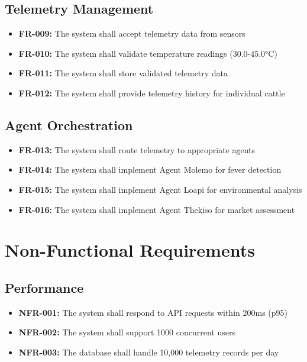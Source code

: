\subsection{Telemetry Management}

\begin{itemize}
    \item \textbf{FR-009:} The system shall accept telemetry data from sensors
    \item \textbf{FR-010:} The system shall validate temperature readings (30.0-45.0°C)
    \item \textbf{FR-011:} The system shall store validated telemetry data
    \item \textbf{FR-012:} The system shall provide telemetry history for individual cattle
\end{itemize}

\subsection{Agent Orchestration}

\begin{itemize}
    \item \textbf{FR-013:} The system shall route telemetry to appropriate agents
    \item \textbf{FR-014:} The system shall implement Agent Molemo for fever detection
    \item \textbf{FR-015:} The system shall implement Agent Loapi for environmental analysis
    \item \textbf{FR-016:} The system shall implement Agent Thekiso for market assessment
\end{itemize}

\section{Non-Functional Requirements}

\subsection{Performance}

\begin{itemize}
    \item \textbf{NFR-001:} The system shall respond to API requests within 200ms (p95)
    \item \textbf{NFR-002:} The system shall support 1000 concurrent users
    \item \textbf{NFR-003:} The database shall handle 10,000 telemetry records per day
\end{itemize}

